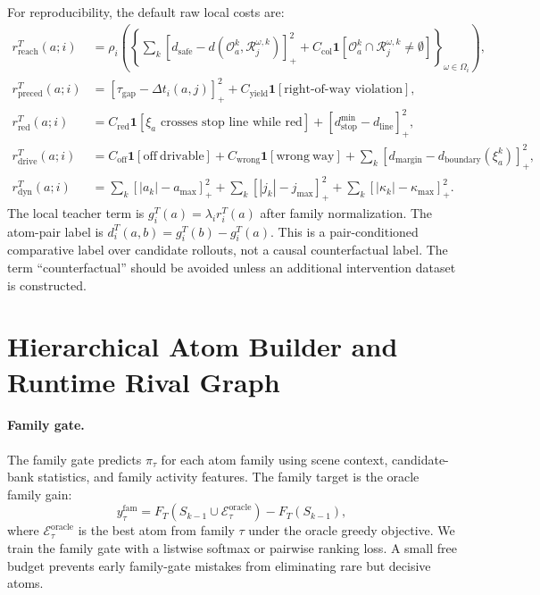 \documentclass{article}
\newcommand{\E}{\mathcal{E}}
\begin{document}
For reproducibility, the default raw local costs are:
\begin{align}
r_{\mathrm{reach}}^T(a;i)&=
\rho_i\!\left(
\left\{\sum_k[d_{\mathrm{safe}}-d(\mathcal O_a^k,\mathcal R_j^{\omega,k})]_+^2
+C_{\mathrm{col}}\mathbf 1[\mathcal O_a^k\cap\mathcal R_j^{\omega,k}\ne\emptyset]\right\}_{\omega\in\Omega_i}
\right),\\
r_{\mathrm{preced}}^T(a;i)&=
[\tau_{\mathrm{gap}}-\Delta t_i(a,j)]_+^2
+C_{\mathrm{yield}}\mathbf 1[\text{right-of-way violation}],\\
r_{\mathrm{red}}^T(a;i)&=
C_{\mathrm{red}}\mathbf 1[\xi_a\text{ crosses stop line while red}]
+[d_{\mathrm{stop}}^{\min}-d_{\mathrm{line}}]_+^2,\\
r_{\mathrm{drive}}^T(a;i)&=
C_{\mathrm{off}}\mathbf 1[\mathrm{off\ drivable}]
+C_{\mathrm{wrong}}\mathbf 1[\mathrm{wrong\ way}]
+\sum_k[d_{\mathrm{margin}}-d_{\mathrm{boundary}}(\xi_a^k)]_+^2,\\
r_{\mathrm{dyn}}^T(a;i)&=
\sum_k[|a_k|-a_{\max}]_+^2+
\sum_k[|j_k|-j_{\max}]_+^2+
\sum_k[|\kappa_k|-\kappa_{\max}]_+^2.
\end{align}
The local teacher term is $g_i^T(a)=\lambda_i r_i^T(a)$ after family normalization. The atom-pair label is $d_i^T(a,b)=g_i^T(b)-g_i^T(a)$. This is a pair-conditioned comparative label over candidate rollouts, not a causal counterfactual label. The term ``counterfactual'' should be avoided unless an additional intervention dataset is constructed.

\section{Hierarchical Atom Builder and Runtime Rival Graph}
\label{app:pairs}

\paragraph{Family gate.}
The family gate predicts $\pi_\tau$ for each atom family using scene context, candidate-bank statistics, and family activity features. The family target is the oracle family gain:
\begin{equation}
    y_\tau^{\mathrm{fam}}=F_T(S_{k-1}\cup \E_\tau^{\mathrm{oracle}})-F_T(S_{k-1}),
\end{equation}
where $\E_\tau^{\mathrm{oracle}}$ is the best atom from family $\tau$ under the oracle greedy objective. We train the family gate with a listwise softmax or pairwise ranking loss. A small free budget prevents early family-gate mistakes from eliminating rare but decisive atoms.
\end{document}
